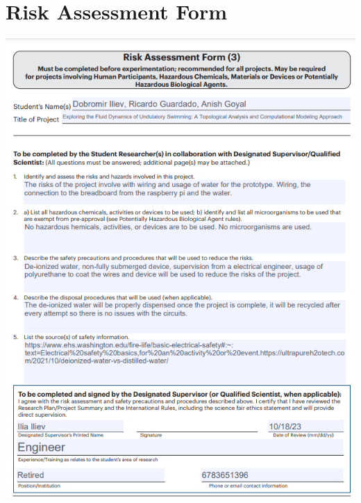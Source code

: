 \documentclass{article}
\begin{document}
\part{Risk Assessment Form}
\includegraphics[width=\textwidth, height=1.2\textwidth]{media/image17.png}

\newpage
\end{document}
